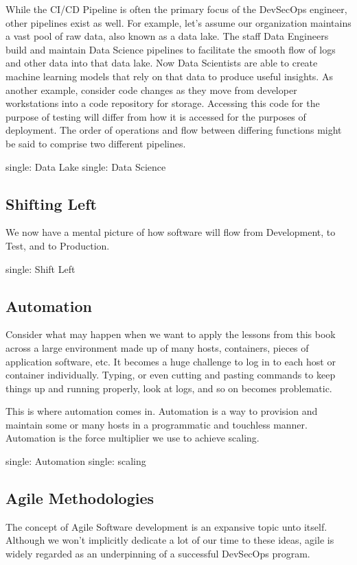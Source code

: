 \justify
While the CI/CD Pipeline is often the primary focus of the DevSecOps
engineer, other pipelines exist as well. For example, let's assume our
organization maintains a vast pool of raw data, also known as a data
lake. The staff Data Engineers build and maintain Data Science pipelines
to facilitate the smooth flow of logs and other data into that data
lake. Now Data Scientists are able to create machine learning models
that rely on that data to produce useful insights. As another example,
consider code changes as they move from developer workstations into a
code repository for storage. Accessing this code for the purpose of
testing will differ from how it is accessed for the purposes of
deployment. The order of operations and flow between differing
functions might be said to comprise two different pipelines.

single: Data Lake single: Data Science

\subsection{Shifting Left}
\justify
We now have a mental picture of how software will flow from Development,
to Test, and to Production.

single: Shift Left

\subsection{Automation}
\justify
Consider what may happen when we want to apply the lessons from this book across a large environment made up of many hosts, containers, pieces of application software, etc. It becomes a huge challenge to log in to each host or container individually. Typing, or even cutting and pasting commands to keep things up and running properly, look at logs,
and so on becomes problematic.

\justify
This is where automation comes in. Automation is a way to provision and maintain some or many hosts in a programmatic and touchless manner. Automation is the force multiplier we use to achieve scaling.

single: Automation single: scaling

\subsection{Agile Methodologies}

\justify
The concept of Agile Software development is an expansive topic unto itself. Although we won't implicitly dedicate a lot of our time to these ideas, agile is widely regarded as an underpinning of a successful
DevSecOps program.

